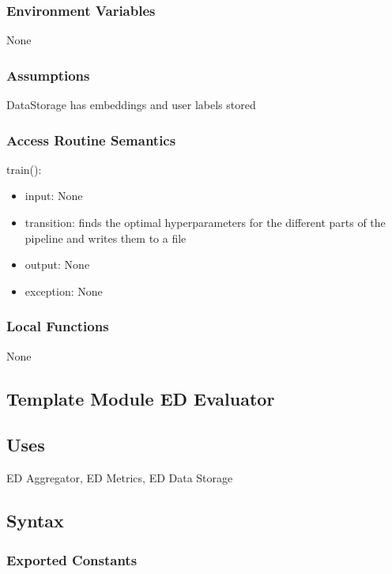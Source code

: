 \documentclass[12pt, titlepage]{article}
\begin{document}
\subsubsection{Environment Variables}

None

\subsubsection{Assumptions}

DataStorage has embeddings and user labels stored

\subsubsection{Access Routine Semantics}

\noindent train():
\begin{itemize}
\item input: None
\item transition: finds the optimal hyperparameters for the different parts of the pipeline and writes them to a file
\item output: None
\item exception: None
\end{itemize}

\subsubsection{Local Functions}

None


\subsection{Template Module ED Evaluator}

\subsection{Uses}

ED Aggregator, ED Metrics, ED Data Storage

\subsection{Syntax}

\subsubsection{Exported Constants}
\end{document}
